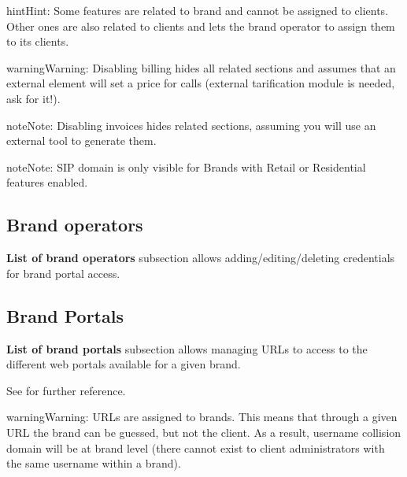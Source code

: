 \documentclass[letterpaper,10pt,english]{sphinxmanual}
\begin{document}
\begin{notice}{hint}{Hint:}
Some features are related to brand and cannot be assigned to clients.
Other ones are also related to clients and lets the brand operator to
assign them to its clients.
\end{notice}

\begin{notice}{warning}{Warning:}
Disabling billing hides all related sections and assumes that an
external element will set a price for calls (external tarification
module is needed, ask for it!).
\end{notice}

\begin{notice}{note}{Note:}
Disabling invoices hides related sections, assuming you will use an
external tool to generate them.
\end{notice}

\begin{notice}{note}{Note:}
SIP domain is only visible for Brands with Retail or Residential features
enabled.
\end{notice}


\subsection{Brand operators}
\label{administration_portal/platform/brands:brand-operators}
\textbf{List of brand operators} subsection allows adding/editing/deleting credentials for brand portal access.


\subsection{Brand Portals}
\label{administration_portal/platform/brands:brand-portals}
\textbf{List of brand portals} subsection allows managing URLs to access to the different web portals available for a given brand.

See {\hyperref[administration_portal/brand/settings/client_portals:client\string-portals]{}} for further reference.

\begin{notice}{warning}{Warning:}
URLs are assigned to brands. This means that through a given URL the brand can be guessed, but not the client.
As a result, username collision domain will be at brand level (there cannot exist to client administrators
with the same username within a brand).
\end{notice}
\end{document}
